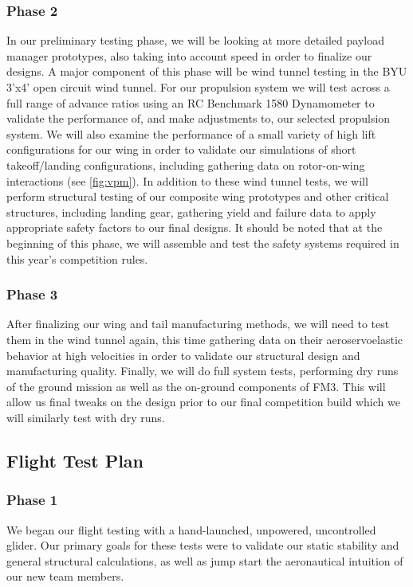 \subsubsection{Phase 2} In our preliminary testing phase, we will be looking at more detailed payload manager prototypes, also taking into account speed in order to finalize our designs. A major component of this phase will be wind tunnel testing in the BYU 3'x4' open circuit wind tunnel.  For our propulsion system we will test across a full range of advance ratios using an RC Benchmark 1580 Dynamometer to validate the performance of, and make adjustments to, our selected propulsion system.  We will also examine the performance of a small variety of high lift configurations for our wing in order to validate our simulations of short takeoff/landing configurations, including gathering data on rotor-on-wing interactions (see \cref{fig:vpm}).  In addition to these wind tunnel tests, we will perform structural testing of our composite wing prototypes and other critical structures, including landing gear, gathering yield and failure data to apply appropriate safety factors to our final designs.  It should be noted that at the beginning of this phase, we will assemble and test the safety systems required in this year's competition rules.

\subsubsection{Phase 3} After finalizing our wing and tail manufacturing methods, we will need to test them in the wind tunnel again, this time gathering data on their aeroservoelastic behavior at high velocities in order to validate our structural design and manufacturing quality.  %
Finally,  we will do full system tests, performing dry runs of the ground mission as well as the on-ground components of FM3. This will allow us final tweaks on the design prior to our final competition build which we will similarly test with dry runs.


\subsection{Flight Test Plan}
\label{ssec:FlightTestingPlan}

\subsubsection{Phase 1} We began our flight testing with a hand-launched, unpowered, uncontrolled glider.  Our primary goals for these tests were to validate our static stability and general structural calculations, as well as jump start the aeronautical intuition of our new team members. 

